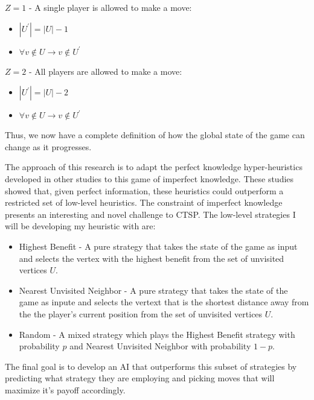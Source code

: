 \documentclass[12pt]{article}%
\begin{document}
	$Z = 1$ - A single player is allowed to make a move:\newline
	
	\begin{itemize}
		\item $| U^{\prime} | = | U | - 1$
		\item $\forall v \notin U \rightarrow v \notin U^{\prime}$
	\end{itemize}

	$Z = 2$ - All players are allowed to make a move:\newline
	
	\begin{itemize}
		\item $| U^{\prime} | = | U | - 2$
		\item $\forall v \notin U \rightarrow v \notin U^{\prime}$
	\end{itemize}

	Thus, we now have a complete definition of how the global state of the game can change as it progresses.\par
	The approach of this research is to adapt the perfect knowledge hyper-heuristics developed in other studies to this game of imperfect knowledge. These studies showed that, given perfect information, these heuristics could outperform a restricted set of low-level heuristics. The constraint of imperfect knowledge presents an interesting and novel challenge to CTSP. The low-level strategies I will be developing my heuristic with are:\newline
	
	\begin{itemize}
		\item Highest Benefit - A pure strategy that takes the state of the game as input and selects the vertex with the highest benefit from the set of unvisited vertices $U$.
		\item Nearest Unvisited Neighbor - A pure strategy that takes the state of the game as inpute and selects the vertext that is the shortest distance away from the the player's current position from the set of unvisited vertices $U$.
		\item Random - A mixed strategy which plays the Highest Benefit strategy with probability $p$ and Nearest Unvisited Neighbor with probability $1 - p$.
	\end{itemize}
	
	The final goal is to develop an AI that outperforms this subset of strategies by predicting what strategy they are employing and picking moves that will maximize it's payoff accordingly.
\end{document}
